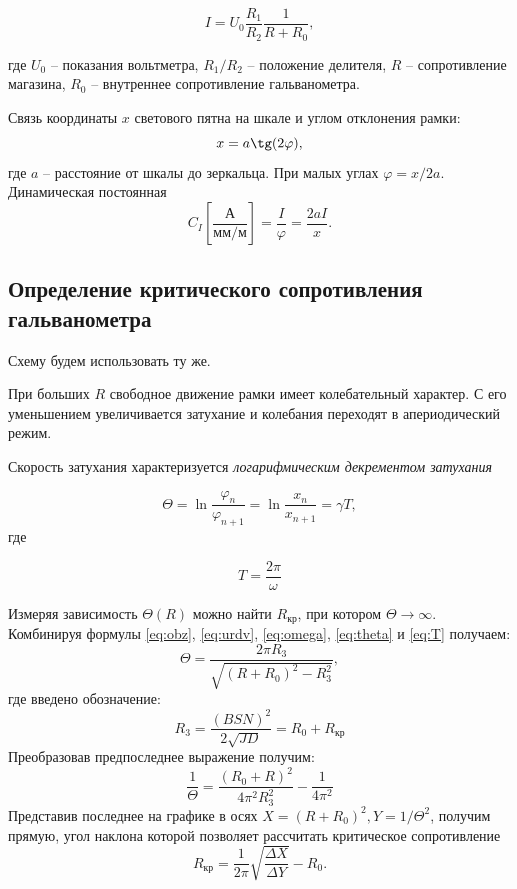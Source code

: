 \documentclass[a4paper, 12pt, twoside]{article}
\begin{document}
\begin{equation}
\label{f14}
I = U_0\dfrac{R_1}{R_2}\dfrac{1}{R + R_0},
\end{equation}

где $U_0$ -- показания вольтметра, $R_1/R_2$ -- положение делителя, $R$ -- сопротивление магазина, $R_0$ -- внутреннее сопротивление гальванометра.

Связь координаты $x$ светового пятна на шкале и углом отклонения рамки:
$$x = a\tg(2\varphi),$$
где $a$ -- расстояние от шкалы до зеркальца. При малых углах $\varphi = x/2a$. Динамическая постоянная
\begin{equation}
\label{f15}
C_I\left[\frac{\text{А}}{\text{мм/м}}\right] = \dfrac{I}{\varphi} = \dfrac{2aI}{x}.
\end{equation}

\subsection{Определение критического сопротивления гальванометра}
Схему будем использовать ту же.

При больших $R$ свободное движение рамки имеет колебательный характер. С его уменьшением увеличивается затухание и колебания переходят в апериодический режим.

Скорость затухания характеризуется \textit{логарифмическим декрементом затухания}

\begin{equation}\label{eq:theta}
\varTheta = \ln\dfrac{\varphi_n}{\varphi_{n+1}} = \ln\dfrac{x_n}{x_{n+1}} = \gamma T,
\end{equation}
где 

\begin{equation}\label{eq:T}
T = \dfrac{2\pi}{\omega}
\end{equation}

Измеряя зависимость $\varTheta(R)$ можно найти $R_\text{кр}$, при котором $\varTheta \rightarrow \infty$. Комбинируя формулы \eqref{eq:obz}, \eqref{eq:urdv}, \eqref{eq:omega}, \eqref{eq:theta} и \eqref{eq:T} получаем:
\begin{equation}
\varTheta = \dfrac{2\pi R_3}{\sqrt{(R + R_0)^2 - R_3^2}},
\end{equation}
где введено обозначение:
\begin{equation}
R_3 = \dfrac{(BSN)^2}{2\sqrt{JD}} = R_0 + R_{\text{кр}}
\end{equation}
Преобразовав предпоследнее выражение получим:
\begin{equation}
\dfrac{1}{\varTheta} = \dfrac{(R_0 + R)^2}{4\pi^2R_3^2} - \dfrac{1}{4\pi^2}
\end{equation}
Представив последнее на графике в осях $X = (R + R_0)^2, Y = 1/\varTheta^2$, получим прямую, угол наклона которой позволяет рассчитать критическое сопротивление
\begin{equation}
\label{f21}
R_{\text{кр}} = \dfrac{1}{2\pi}\sqrt{\dfrac{\Delta X}{\Delta Y}} - R_0.
\end{equation}
\end{document}
